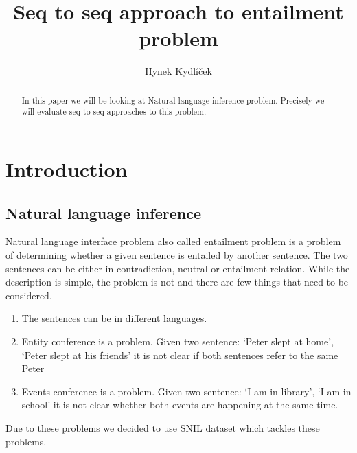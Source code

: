 \documentclass{article}
\author{Hynek Kydlíček}
\title{Seq to seq approach to entailment problem}
\begin{document}
    \maketitle
    \begin{abstract}
        In this paper we will be looking at Natural language inference problem.
        Precisely we will evaluate seq to seq approaches to this problem.
    \end{abstract}

    \section{Introduction}


    \subsection{Natural language inference}
    Natural language interface problem also called entailment problem is a problem of determining whether a given sentence is entailed by another sentence.
    The two sentences can be either in contradiction, neutral or entailment relation.
    While the description is simple, the problem is not and there are few things that need to be considered.
    \begin{enumerate}
        \item The sentences can be in different languages.
        \item Entity conference is a problem. Given two sentence: `Peter slept at home', `Peter slept at his friends' it is not clear if both sentences refer to the same Peter
        \item Events conference is a problem. Given two sentence: `I am in library', `I am in school' it is not clear whether both events are happening at the same time.
    \end{enumerate}
    Due to these problems we decided to use SNIL dataset which tackles these problems.
\end{document}
